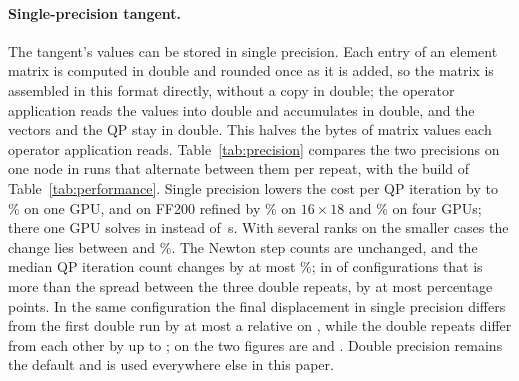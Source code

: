 \documentclass[sigconf,nonacm]{acmart}
\begin{document}
\paragraph{Single-precision tangent.} The tangent's values can be stored in single precision. Each
entry of an element matrix is computed in double and rounded once as it is added, so the matrix is
assembled in this format directly, without a copy in double; the operator application reads the
values into double and accumulates in double, and the vectors and the QP stay in double. This
halves the bytes of matrix values each operator application reads. Table~\ref{tab:precision}
compares the two precisions on one node in \precisionRuns{} runs that alternate between them per
repeat, with the build of Table~\ref{tab:performance}. Single precision lowers the cost per QP
iteration by \singleGpuOneMin{} to \singleGpuOneMax\% on one GPU, and on FF200 refined by
\singleRefinedGrace\% on $16\times18$ and \singleRefinedFour\% on four GPUs; there one GPU solves in
\solveSingleFFfGpuOne{} instead of \solveDoubleFFfGpuOne\,\si{\second}. With several ranks on the
smaller cases the change lies between \singleSmallMin{} and \singleSmallMax\%. The Newton step
counts are unchanged, and the median QP iteration count changes by at most \singleQpChange\%; in
\singleQpOutside{} of \singleQpConfigs{} configurations that is more than the spread between the
three double repeats, by at most \singleQpExcess{} percentage points. In the same configuration
the final displacement in single precision differs from the first double run by at most a
relative \agreeSingle{} on \convergedCases{}, while the double repeats differ from each other by
up to \agreeDouble{}; on \unconvergedCases{} the two figures are \agreeSingleUnconverged{} and
\agreeDoubleUnconverged{}. Double precision remains the default and is used everywhere else in
this paper.
\end{document}

